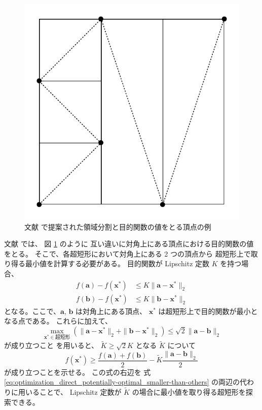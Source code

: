 \begin{figure}[tp]
    \centering
    \includegraphics[width=0.7\linewidth]{optimization/ADC-partitions-image.pdf}
    \caption{文献 \cite{Sergeyev2000} で提案された領域分割と目的関数の値をとる頂点の例}
    \label{fig:optimization_adc_partitions-image}
\end{figure}

文献 \cite{Sergeyev2000} では、
図 \ref{fig:optimization_adc_partitions-image} のように
互い違いに対角上にある頂点における目的関数の値をとる。
そこで、各超短形において対角上にある 2 つの頂点から
超短形上で取り得る最小値を計算する必要がある。
目的関数が Lipschitz 定数 $K$ を持つ場合、
\begin{align}
    f(\bm{a}) - f(\bm{x}^*) &\le K \|\bm{a} - \bm{x}^*\|_2 \\
    f(\bm{b}) - f(\bm{x}^*) &\le K \|\bm{b} - \bm{x}^*\|_2
\end{align}
となる。ここで、$\bm{a}$, $\bm{b}$ は対角上にある頂点、
$\bm{x}^*$ は超短形上で目的関数が最小となる点である。
これらに加えて、
\begin{equation}
    \max_{\bm{x}^* \in \text{超短形}}{(\|\bm{a} - \bm{x}^*\|_2 + \|\bm{b} - \bm{x}^*\|_2)} \le \sqrt{2} \|\bm{a} - \bm{b}\|_2
\end{equation}
が成り立つこと \cite[Lemma 2.]{Molinaro2001} を用いると、
$\tilde{K} \ge \sqrt{2} K$ となる $\tilde{K}$ について
\begin{equation}
    f(\bm{x}^*) \ge \frac{f(\bm{a}) + f(\bm{b})}{2} - \tilde{K} \frac{\|\bm{a} - \bm{b}\|_2}{2}
\end{equation}
が成り立つことを示せる\cite[Theorem 2.1]{Sergeyev2006}。
この式の右辺を
式 \eqref{eq:optimization_direct_potentially-optimal_smaller-than-others}
の両辺の代わりに用いることで、
Lipschitz 定数が $\tilde{K}$ の場合に最小値を取り得る超短形を探索できる。
